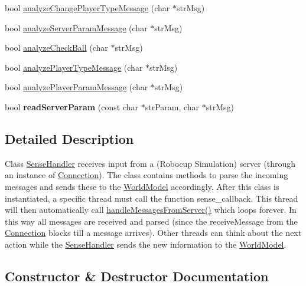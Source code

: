 \begin{DoxyCompactItemize}
\item 
bool \hyperlink{classSenseHandler_aa44909ec201afdda1ef2d7c6e06a795f}{analyze\+Change\+Player\+Type\+Message} (char $\ast$str\+Msg)
\item 
bool \hyperlink{classSenseHandler_a16fe093a0c0cafd65b15cfac75d8ca53}{analyze\+Server\+Param\+Message} (char $\ast$str\+Msg)
\item 
bool \hyperlink{classSenseHandler_a976653672fc494dfac0cb116d62ede27}{analyze\+Check\+Ball} (char $\ast$str\+Msg)
\item 
bool \hyperlink{classSenseHandler_aaf8c288f90d2fab73dea46fd1f5d6a8a}{analyze\+Player\+Type\+Message} (char $\ast$str\+Msg)
\item 
bool \hyperlink{classSenseHandler_ac448828caeca51cc661428c72dda44ac}{analyze\+Player\+Param\+Message} (char $\ast$str\+Msg)
\item 
bool {\bfseries read\+Server\+Param} (const char $\ast$str\+Param, char $\ast$str\+Msg)\hypertarget{classSenseHandler_a21fa42c454a09c642dc5f4d600768cac}{}\label{classSenseHandler_a21fa42c454a09c642dc5f4d600768cac}

\end{DoxyCompactItemize}


\subsection{Detailed Description}
Class \hyperlink{classSenseHandler}{Sense\+Handler} receives input from a (Robocup Simulation) server (through an instance of \hyperlink{classConnection}{Connection}). The class contains methods to parse the incoming messages and sends these to the \hyperlink{classWorldModel}{World\+Model} accordingly. After this class is instantiated, a specific thread must call the function sense\+\_\+callback. This thread will then automatically call \hyperlink{classSenseHandler_ac0f4abc8eba5206791c25ba9274ce084}{handle\+Messages\+From\+Server()} which loops forever. In this way all messages are received and parsed (since the receive\+Message from the \hyperlink{classConnection}{Connection} blocks till a message arrives). Other threads can think about the next action while the \hyperlink{classSenseHandler}{Sense\+Handler} sends the new information to the \hyperlink{classWorldModel}{World\+Model}. 

\subsection{Constructor \& Destructor Documentation}
